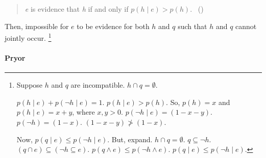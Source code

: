\begin{note}
  \begin{quote}
    \emph{e} is evidence that \emph{h} if and only if \(p(h \mid e) > p(h)\).%
    \mbox{ }\hfill\mbox{(\citeauthor[45]{Achinstein:2001ub})}
  \end{quote}

  Then, impossible for \(e\) to be evidence for both \(h\) and \(q\) such that \(h\) and \(q\) cannot jointly occur.
  \footnote{
    Suppose \(h\) and \(q\) are incompatible.
    \(h \cap q = \emptyset\).

    \(p(h \mid e) + p(\lnot h \mid e) = 1\).
    \(p(h \mid e) > p(h)\).
    So, \(p(h) = x\) and \(p(h \mid e) = x + y\), where \(x, y > 0\).
    \(p(\lnot h \mid e) = (1 - x - y)\).
    \(p(\lnot h) = (1 - x)\).
    \((1 - x - y) \not> (1 - x)\).

    Now, \(p(q \mid e) \leq p(\lnot h \mid e)\).
    But, expand.
    \(h \cap q = \emptyset\).
    \(q \subseteq \lnot h\).
    \((q \cap e) \subseteq (\lnot h \subseteq e)\).
    \(p(q \land e) \leq p(\lnot h \land e)\).
    \(p(q \mid e) \leq p(\lnot h \mid e)\).
  }
\end{note}

\paragraph{Pryor}

